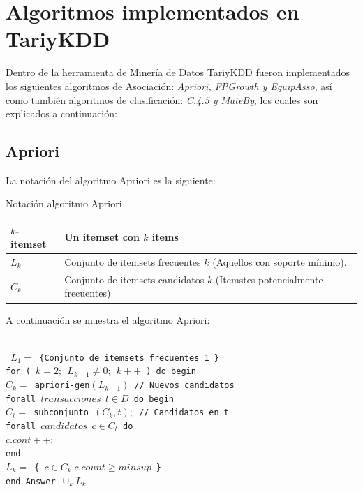 \section{Algoritmos implementados en TariyKDD}
Dentro de la herramienta de Miner\'ia de Datos TariyKDD fueron implementados los siguientes algoritmos de
Asociaci\'on: \textit{Apriori, FPGrowth y EquipAsso}, as\'i como tambi\'en algoritmos de clasificaci\'on:
\textit{C.4.5 y MateBy}, los cuales son explicados a continuaci\'on:

\subsection{Apriori}
La notaci\'on del algoritmo Apriori \cite{4} es la siguiente:\\

\begin{table}[h]
\caption{Notaci\'on algoritmo Apriori}
\end{table}
\begin{center}
\begin{tabular}{|p{40mm}|p{40mm}|}\hline
\textbf{$k$-itemset} & \textbf{Un itemset con $k$ items}\\ \hline
$L_{k}$              & Conjunto de itemsets frecuentes $k$ (Aquellos con soporte m\'inimo).\\ \hline
$C_{k}$              & Conjunto de itemsets candidatos $k$ (Itemstes potencialmente frecuentes)\\ \hline
\end{tabular}
\end{center}


A continuaci\'on se muestra el algoritmo Apriori:\\ \\
\begin{footnotesize}
\texttt{
\noindent 		$L_{1} =$ \{Conjunto de itemsets frecuentes 1 \}\\
	  		for ( $k=2;\ \ L_{k-1}\neq0;\ \  k++$  ) do begin\\
\indent   		$C_{k}=$ apriori-gen$(L_{k-1})$ // Nuevos candidatos\\
\indent 		forall $transacciones\ \ t\in D$ do begin\\
\indent\indent 			$C_{t}=$ subconjunto $(C_{k}, t);$ // Candidatos en t\\
\indent\indent 			forall $candidatos\ \ c \in C_{t}$ do\\
\indent\indent\indent 			$c.cont++;$\\
\indent 			end\\
\indent 		$L_{k}=$ \{ $c \in C_{k} | c.count \geq minsup$ \}\\
			end
			Answer $\cup_{k} L_{k}$\\
}
\end{footnotesize}

